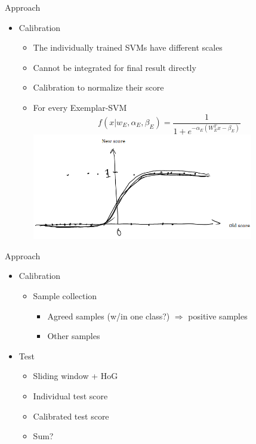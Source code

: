\documentclass[12pt]{beamer}
\begin{document}
\begin{frame}{Approach}
	\begin{itemize}
		\item Calibration
		\begin{itemize}
			\item The individually trained SVMs have different scales
			\item Cannot be integrated for final result directly
			\item Calibration to normalize their score
			\item For every Exemplar-SVM
			\[f(x|w_E,\alpha_E,\beta_E) = \frac{1}{1 + e^{-\alpha_E(W_E^Tx-\beta_E)}}\]
			\includegraphics[width=0.8\textwidth]{esvm-calibration.png}
		\end{itemize}
	\end{itemize}
\end{frame}

\begin{frame}{Approach}
	\begin{itemize}
		\item Calibration
		\begin{itemize}
			\item Sample collection
			\begin{itemize}
				\item Agreed samples (w/in one class?) $\Rightarrow$ positive samples
				\item Other samples %
			\end{itemize}
		\end{itemize}
		\item Test
		\begin{itemize}
			\item Sliding window + HoG
			\item Individual test score
			\item Calibrated test score
			\item Sum?
		\end{itemize}
	\end{itemize}
\end{frame}
\end{document}
